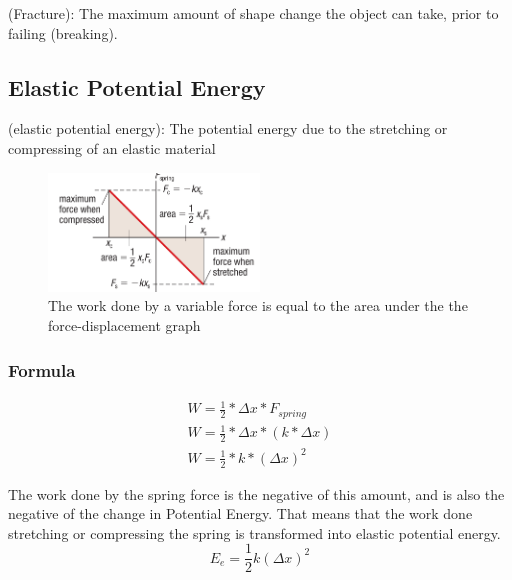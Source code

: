 \begin{definition}
    (Fracture): The maximum amount of shape change the object can take, prior to failing (breaking).
\end{definition}

\subsection{Elastic Potential Energy}
\begin{definition}
    (elastic potential energy): The potential energy due to the stretching or compressing of an elastic material
\end{definition}

\begin{figure} [h!]
    \centering
    \includegraphics[width=0.5\textwidth]{graph/elastic Potential energy.png}
    \caption{The work done by a variable force is equal to the area under the the force-displacement graph}
\end{figure}

\subsubsection*{Formula}
\begin{gather}
    W = \frac{1}{2} * \Delta x * F_{spring}\\
    W = \frac{1}{2} * \Delta x * (k * \Delta x)\\
    W = \frac{1}{2} * k * (\Delta x)^2
\end{gather}

The work done by the spring force is the negative of this amount, and is also the negative of the change in Potential Energy.
That means that the work done stretching or compressing the spring is transformed into elastic potential energy.
\begin{equation}
    E_e = \frac{1}{2} k (\Delta x)^2
\end{equation}